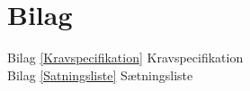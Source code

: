 \chapter{Bilag}\label{kapitel_Bilag}

Bilag \ref{Kravspecifikation} Kravspecifikation \\
Bilag \ref{Satningsliste} Sætningsliste